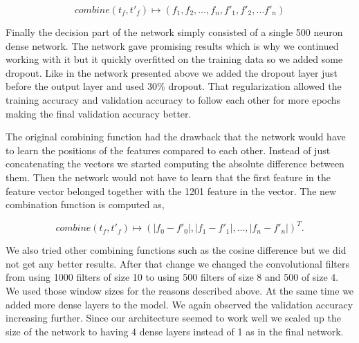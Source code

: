 \begin{equation}
    combine(t_f, t'_f) \mapsto (f_1, f_2, \dots, f_n, f'_1, f'_2, \dots f'_n)
\end{equation}

Finally the decision part of the network simply consisted of a single 500 neuron
dense network. The network gave promising results which is why we continued
working with it but it quickly overfitted on the training data so we added some
dropout. Like in the network presented above we added the dropout layer just
before the output layer and used 30\% dropout. That regularization allowed the
training accuracy and validation accuracy to follow each other for more epochs
making the final validation accuracy better.

The original combining function had the drawback that the network would have
to learn the positions of the features compared to each other. Instead of just
concatenating the vectors we started computing the absolute difference between
them. Then the network would not have to learn that the first feature in the
feature vector belonged together with the 1201 feature in the vector. The new
combination function is computed as,

\begin{equation}\label{eq:abs}
    combine(t_f, t'_f) \mapsto \left(
        |f_0 - f'_0|, |f_1 - f'_1|, \dots, |f_n - f'_n|
    \right)^T.
\end{equation}

We also tried other combining functions such as the cosine difference but we
did not get any better results. After that change we changed the convolutional
filters from using 1000 filters of size 10 to using 500 filters of size 8 and
500 of size 4. We used those window sizes for the reasons described above. At
the same time we added more dense layers to the model. We again observed the
validation accuracy increasing further. Since our architecture seemed to work
well we scaled up the size of the network to having 4 dense layers instead of 1
as in the final network.

